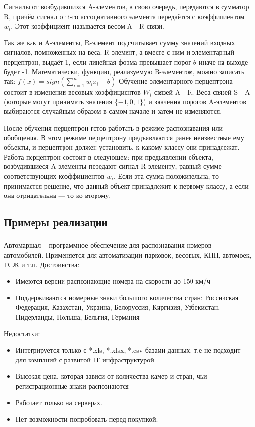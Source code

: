 Сигналы от возбудившихся A-элементов, в свою очередь, передаются в сумматор R, причём сигнал от i-го ассоциативного элемента передаётся с коэффициентом $w_i$. Этот коэффициент называется весом A—R связи.

Так же как и A-элементы, R-элемент подсчитывает сумму значений входных сигналов, помноженных на веса. R-элемент, а вместе с ним и элементарный перцептрон, выдаёт 1, если линейная форма превышает порог $\theta$ иначе на выходе будет -1. Математически, функцию, реализуемую R-элементом, можно записать так:
$f(x) = sign(\sum_{i=1}^{n} w_i x_i - \theta)$
Обучение элементарного перцептрона состоит в изменении весовых коэффициентов $W_i$ связей A—R. Веса связей S—A (которые могут принимать значения $\{ -1, 0, 1 \}$) и значения порогов A-элементов выбираются случайным образом в самом начале и затем не изменяются.

После обучения перцептрон готов работать в режиме распознавания или обобщения. В этом режиме перцептрону предъявляются ранее неизвестные ему объекты, и перцептрон должен установить, к какому классу они принадлежат. Работа перцептрон состоит в следующем: при предъявлении объекта, возбудившиеся A-элементы передают сигнал R-элементу, равный сумме соответствующих коэффициентов $w_i$. Если эта сумма положительна, то принимается решение, что данный объект принадлежит к первому классу, а если она отрицательна — то ко второму.

\subsection{Примеры реализации}
\label{sub:domain:realization}

\subsubsection{}
\label{sub:domain:realization:automarshal}
Автомаршал – программное обеспечение для распознавания номеров автомобилей. Применяется для автоматизации парковок, весовых, КПП, автомоек, ТСЖ и т.п.\cite{auto_marshal}
Достоинства:
\begin{itemize}
  \item Имеются версии распознающие номера на скорости до 150 км/ч
  \item Поддерживаются номерные знаки большого количества стран: Российская Федерация, Казахстан, Украина, Белоруссия, Киргизия, Узбекистан, Нидерланды, Польша, Бельгия, Германия
\end{itemize}
Недостатки:
\begin{itemize}
  \item Интегрируется только с *.xls, *.xlsx, *.csv базами данных, т.е не подходит для компаний с развитой IT инфраструктурой
  \item Высокая цена, которая зависи от количества камер и стран, чьи регистрационные знаки распознаются
  \item Работает только на \windows{} серверах.
  \item Нет возможности попробовать перед покупкой.
\end{itemize}

